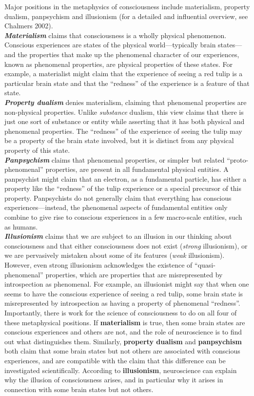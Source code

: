 \documentclass[12pt]{article}
\newcommand{\infopar}{\\[5pt]}
\begin{document}
\begin{infobox} 

Major positions in the metaphysics of consciousness include materialism, property dualism, panpsychism and illusionism (for a detailed and influential overview, see Chalmers 2002). 
\infopar
\textbf{\textit{Materialism}} claims that consciousness is a wholly physical phenomenon. Conscious experiences are states of the physical world—typically brain states—and the properties that make up the phenomenal character of our experiences, known as phenomenal properties, are physical properties of these states. For example, a materialist might claim that the experience of seeing a red tulip is a particular brain state and that the ``redness'' of the experience is a feature of that state.
\infopar
\textbf{\textit{Property dualism}} denies materialism, claiming that phenomenal properties are non-physical properties. Unlike \textit{substance} dualism, this view claims that there is just one sort of substance or entity while asserting that it has both physical and phenomenal properties. The ``redness'' of the experience of seeing the tulip may be a property of the brain state involved, but it is distinct from any physical property of this state. \infopar
\textbf{\textit{Panpsychism}} claims that phenomenal properties, or simpler but related ``proto-phenomenal'' properties, are present in all fundamental physical entities. A panpsychist might claim that an electron, as a fundamental particle, has either a property like the ``redness'' of the tulip experience or a special precursor of this property. Panpsychists do not generally claim that everything has conscious experiences—instead, the phenomenal aspects of fundamental entities only combine to give rise to conscious experiences in a few macro-scale entities, such as humans. 
\infopar
\textbf{\textit{Illusionism}} claims that we are subject to an illusion in our thinking about consciousness and that either consciousness does not exist (\textit{strong} illusionism), or we are pervasively mistaken about some of its features (\textit{weak} illusionism). However, even strong illusionism acknowledges the existence of ``quasi-phenomenal'' properties, which are properties that are misrepresented by introspection as phenomenal. For example, an illusionist might say that when one seems to have the conscious experience of seeing a red tulip, some brain state is misrepresented by introspection as having a property of phenomenal ``redness''. 
\infopar
Importantly, there is work for the science of consciousness to do on all four of these metaphysical positions. If \textbf{materialism} is true, then some brain states are conscious experiences and others are not, and the role of neuroscience is to find out what distinguishes them. Similarly, \textbf{property dualism} and \textbf{panpsychism} both claim that some brain states but not others are associated with conscious experiences, and are compatible with the claim that this difference can be investigated scientifically. According to \textbf{illusionism}, neuroscience can explain why the illusion of consciousness arises, and in particular why it arises in connection with some brain states but not others.


\end{infobox}
\end{document}
